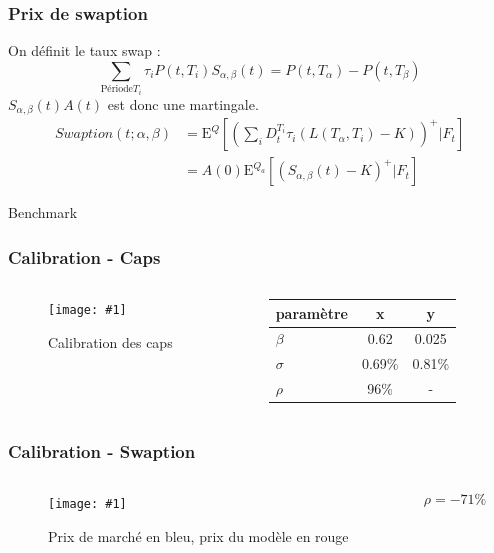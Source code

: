 \documentclass{beamer}
\newcommand{\espr}[1]{
  \mathrm{E}^Q \left[ #1 \right]
}
\newcommand{\Qespr}[2]{
  \mathrm{E}^{#1} \left[ #2 \right]
}
\newcommand{\IMG}[3]{
  \begin{figure}[H]
    \centering
    \texttt{[image: \#1]}%
    \caption{#2}
    \label{#1}
  \end{figure}
}
\begin{document}
\begin{frame}
  \frametitle{Prix de swaption}
  \begin{adjustwidth}{-2em}{-2em}
    On définit le taux swap :
    $$\sum\limits_{\text{Période} T_i} \tau_i P(t, T_i) S_{\alpha, \beta} (t) = P(t, T_\alpha) - P(t, T_\beta)$$
    $S_{\alpha, \beta}(t)  A(t)$ est donc une martingale.
     {
      \begin{align*}
        Swaption(t; \alpha,\beta)
        &= \espr{ \left( \sum_{i} D_t^{T_i} \tau_i \left(L(T_{\alpha}, T_i) - K \right) \right)^+ | F_t } \\
        &= A(0) \Qespr{Q_a}{ (S_{\alpha, \beta}(t) - K)^+ | F_t}
      \end{align*}
    }
  \end{adjustwidth}
\end{frame}

\begin{frame}
  Benchmark
  
\end{frame}

\begin{frame}
  \frametitle{Calibration - Caps}
  \begin{columns}
    \begin{column}{0.4\textwidth}
      \IMG{img/calibrationcap.png}{Calibration des caps}{0.2}
    \end{column}
    \begin{column}{0.4\textwidth}
      \centering
      \begin{tabular}{ l |c| c }
        paramètre & x & y  \\
        \hline \hline
        $\beta$ & 0.62 & 0.025 \\
        $\sigma$ & 0.69\% & 0.81\% \\
        $\rho$ & 96\% & - \\
      \end{tabular}
    \end{column}
​  \end{columns}
\end{frame}

\begin{frame}

\end{frame}

\begin{frame}
  \frametitle{Calibration - Swaption}
    \begin{columns}
      \begin{column}{0.4\textwidth}
        \IMG{img/swapcalib.png}{Prix de marché en bleu, prix du modèle en rouge }{0.2}
    \end{column}
    \begin{column}{0.4\textwidth}
      \centering
      $$ \rho = -71\%$$
    \end{column}
​  \end{columns}

\end{frame}
\end{document}
